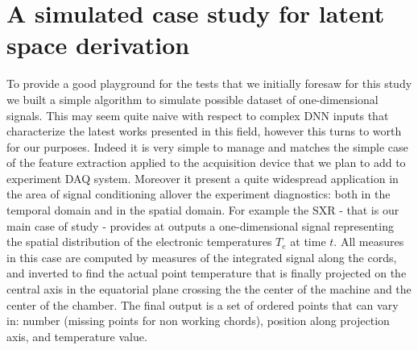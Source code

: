 \section{A simulated case study for latent space derivation}

To provide a good playground for the tests that we initially foresaw for this study we built a simple algorithm to simulate possible dataset of one-dimensional signals. This may seem quite naive with respect to complex \acs{DNN} inputs that characterize the latest works presented in this field, however this turns to worth for our purposes. Indeed it is very simple to manage and matches the simple case of the feature extraction applied to the acquisition device that we plan to add to experiment \acs{DAQ} system. Moreover it present a quite widespread application in the area of signal conditioning allover the experiment diagnostics: both in the temporal domain and in the spatial domain. For example the \acs{SXR} - that is our main case of study - provides at outputs a one-dimensional signal representing the spatial distribution of the electronic temperatures $T_e$ at time $t$. All measures in this case are computed by measures of the integrated signal along the cords, and inverted to find the actual point temperature that is finally projected on the central axis in the equatorial plane crossing the the center of the machine and the center of the chamber. The final output is a set of ordered points that can vary in: number (missing points for non working chords), position along projection axis, and temperature value.

